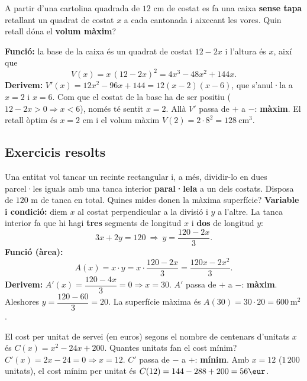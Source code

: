 \begin{exemple}
A partir d'una cartolina quadrada de $12$ cm de costat es fa una caixa \textbf{sense
tapa} retallant un quadrat de costat $x$ a cada cantonada i aixecant les vores. Quin
retall dóna el \textbf{volum màxim}?

\medskip
\noindent\textbf{Funció:} la base de la caixa és un quadrat de costat $12-2x$ i l'altura
és $x$, així que
\[
V(x)=x\,(12-2x)^2=4x^3-48x^2+144x.
\]
\noindent\textbf{Derivem:} $V'(x)=12x^2-96x+144=12(x-2)(x-6)$, que s'anul·la a $x=2$ i
$x=6$. Com que el costat de la base ha de ser positiu ($12-2x>0\Rightarrow x<6$), només
té sentit $x=2$. Allà $V'$ passa de $+$ a $-$: \textbf{màxim}. El retall òptim és $x=2$
cm i el volum màxim $V(2)=2\cdot 8^2=128\ \text{cm}^3$.
\end{exemple}

\subsection{Exercicis resolts}

\begin{exresolt}
Una entitat vol tancar un recinte rectangular i, a més, dividir-lo en dues parcel·les
iguals amb una tanca interior \textbf{paral·lela} a un dels costats. Disposa de $120$ m
de tanca en total. Quines mides donen la màxima superfície?
\solucio
\textbf{Variable i condició:} diem $x$ al costat perpendicular a la divisió i $y$ a
l'altre. La tanca interior fa que hi hagi \textbf{tres} segments de longitud $x$ i
\textbf{dos} de longitud $y$:
\[
3x+2y=120 \ \Rightarrow\ y=\frac{120-2x}{3}.
\]
\textbf{Funció (àrea):}
\[
A(x)=x\cdot y=x\cdot\frac{120-2x}{3}=\frac{120x-2x^2}{3}.
\]
\textbf{Derivem:} $A'(x)=\dfrac{120-4x}{3}=0 \Rightarrow x=30$. $A'$ passa de $+$ a $-$:
\textbf{màxim}. Aleshores $y=\dfrac{120-60}{3}=20$. La superfície màxima és
$A(30)=30\cdot 20=600\ \text{m}^2$.
\end{exresolt}

\begin{exresolt}
El cost per unitat de servei (en euros) segons el nombre de centenars d'unitats $x$ és
$C(x)=x^2-24x+200$. Quantes unitats fan el cost mínim?
\solucio
$C'(x)=2x-24=0\Rightarrow x=12$. $C'$ passa de $-$ a $+$: \textbf{mínim}. Amb $x=12$
($1\,200$ unitats), el cost mínim per unitat és $C(12)=144-288+200=56\eur$.
\end{exresolt}

